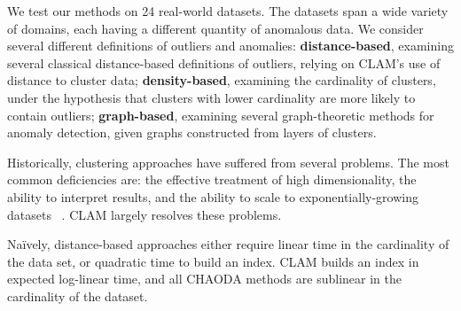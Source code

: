 We test our methods on 24 real-world datasets.
The datasets span a wide variety of domains, each having a different quantity of anomalous data.
We consider several different definitions of outliers and anomalies: \textbf{distance-based}, examining several classical distance-based definitions of outliers, relying on CLAM's use of distance to cluster data; \textbf{density-based}, examining the cardinality of clusters, under the hypothesis that clusters with lower cardinality are more likely to contain outliers; \textbf{graph-based}, examining several graph-theoretic methods for anomaly detection, given graphs constructed from layers of clusters.

Historically, clustering approaches have suffered from several problems.
The most common deficiencies are: the effective treatment of high dimensionality, the ability to interpret results, and the ability to scale to exponentially-growing datasets ~\cite{agrawal1998automatic}.
CLAM largely resolves these problems.

Na\"ively, distance-based approaches either require linear time in the cardinality of the data set, or quadratic time to build an index. CLAM builds an index in expected log-linear time, and all CHAODA methods are sublinear in the cardinality of the dataset.

